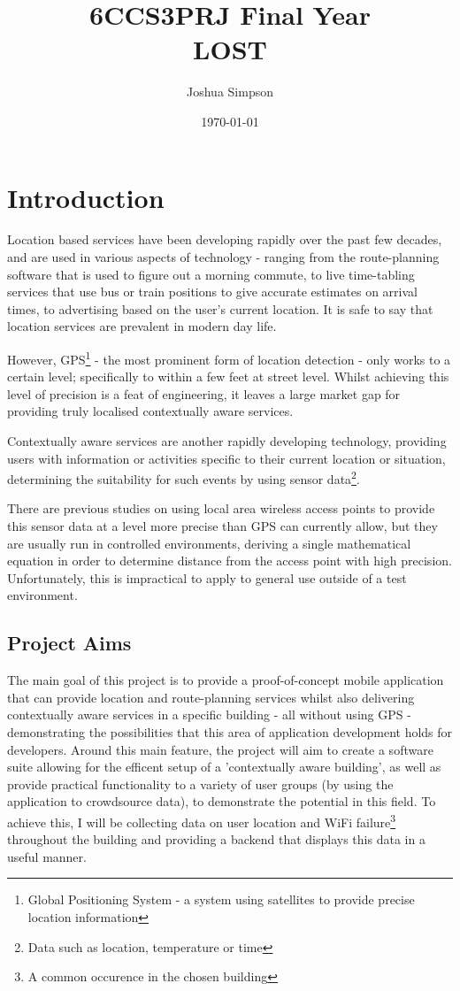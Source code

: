 \documentclass[11pt]{informatics-report}
\title{6CCS3PRJ Final Year\\\vspace{0.2cm} LOST}
\author{Joshua Simpson}
\date{\today}
\begin{document}
\createFrontMatter
\onehalfspacing
\tableofcontents
\doublespacing


\chapter{Introduction}
Location based services have been developing rapidly over the past few decades, and are used in various aspects of technology - ranging from the route-planning software that is used to figure out a morning commute, to live time-tabling services that use bus or train positions to give accurate estimates on arrival times, to advertising based on the user's current location. It is safe to say that location services are prevalent in modern day life.

However, GPS\footnote{ Global Positioning System - a system using satellites to provide precise location information} - the most prominent form of location detection - only works to a certain level;  specifically to within a few feet at street level\cite{cook2005indoor}. Whilst achieving this level of precision is a feat of engineering, it leaves a large market gap for providing truly localised contextually aware services. 

Contextually aware services are another rapidly developing technology, providing users with information or activities specific to their current location or situation, determining the suitability for such events by using sensor data\footnote{ Data such as location, temperature or time }. 

There are previous studies on using local area wireless access points to provide this sensor data at a level more precise than GPS can currently allow, but they are usually run in controlled environments, deriving a single mathematical equation in order to determine distance from the access point with high precision\cite{996891}. Unfortunately, this is impractical to apply to general use outside of a test environment.
\newline \newline 


\section{Project Aims}

The main goal of this project is to provide a proof-of-concept mobile application that can provide location and route-planning services whilst also delivering contextually aware services in a specific building - all without using GPS - demonstrating the possibilities that this area of application development holds for developers. Around this main feature, the project will aim to create a software suite allowing for the efficent setup of a 'contextually aware building', as well as provide practical functionality to a variety of user groups (by using the application to crowdsource data), to demonstrate the potential in this field. To achieve this, I will be collecting data on user location and WiFi failure\footnote{A common occurence in the chosen building} throughout the building and providing a backend that displays this data in a useful manner.
\end{document}
